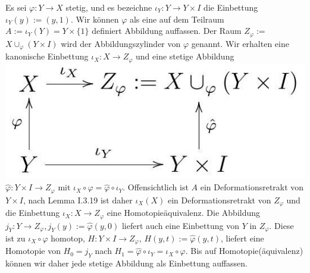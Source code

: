 \documentclass[10pt, letterpaper]{article}
\begin{document}
Es sei $\varphi: Y \rightarrow X$ stetig, und es bezeichne $\iota_{Y}: Y \rightarrow Y \times I$ die Einbettung $\iota_{Y}(y):=(y, 1)$. Wir können $\varphi$ als eine auf dem Teilraum $A:=\iota_{Y}(Y)=Y \times\{1\}$ definiert Abbildung auffassen. Der Raum $Z_{\varphi}:=$ $X \cup_{\varphi}(Y \times I)$ wird der Abbildungszylinder von $\varphi$ genannt. Wir erhalten eine kanonische Einbettung $\iota_{X}: X \rightarrow Z_{\varphi}$ und eine stetige Abbildung\\
\includegraphics[max width=\textwidth]{2025_06_05_d7ed2bacd1e9ce1db1f0g-028} $\hat{\varphi}: Y \times I \rightarrow Z_{\varphi}$ mit $\iota_{X} \circ \varphi=\hat{\varphi} \circ \iota_{Y}$. Offensichtlich ist $A$ ein Deformationsretrakt von $Y \times I$, nach Lemma I.3.19 ist daher $\iota_{X}(X)$ ein Deformationsretrakt von $Z_{\varphi}$ und die Einbettung $\iota_{X}: X \rightarrow Z_{\varphi}$ eine Homotopieäquivalenz. Die Abbildung $j_{Y}: Y \rightarrow Z_{\varphi}, j_{Y}(y):=\hat{\varphi}(y, 0)$ liefert auch eine Einbettung von $Y$ in $Z_{\varphi}$. Diese ist zu $\iota_{X} \circ \varphi$ homotop, $H: Y \times I \rightarrow Z_{\varphi}$, $H(y, t):=\hat{\varphi}(y, t)$, liefert eine Homotopie von $H_{0}=j_{Y}$ nach $H_{1}=\hat{\varphi} \circ \iota_{Y}=\iota_{X} \circ \varphi$. Bis auf Homotopie(äquivalenz) können wir daher jede stetige Abbildung als Einbettung auffassen.
\end{document}
